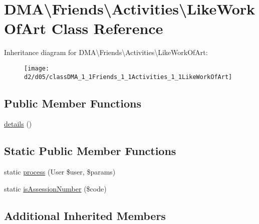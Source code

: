 \hypertarget{classDMA_1_1Friends_1_1Activities_1_1LikeWorkOfArt}{\section{D\+M\+A\textbackslash{}Friends\textbackslash{}Activities\textbackslash{}Like\+Work\+Of\+Art Class Reference}
\label{classDMA_1_1Friends_1_1Activities_1_1LikeWorkOfArt}
}
Inheritance diagram for D\+M\+A\textbackslash{}Friends\textbackslash{}Activities\textbackslash{}Like\+Work\+Of\+Art\+:\begin{figure}[H]
\begin{center}
\leavevmode
\texttt{[image: d2/d05/classDMA\_1\_1Friends\_1\_1Activities\_1\_1LikeWorkOfArt]}
\end{center}
\end{figure}
\subsection*{Public Member Functions}
\begin{DoxyCompactItemize}
\item 
\hyperlink{classDMA_1_1Friends_1_1Activities_1_1LikeWorkOfArt_ad8755c7d0fc4f34acfabc7716acfd52c}{details} ()
\end{DoxyCompactItemize}
\subsection*{Static Public Member Functions}
\begin{DoxyCompactItemize}
\item 
static \hyperlink{classDMA_1_1Friends_1_1Activities_1_1LikeWorkOfArt_a814a0bc1a22cc72f91dac635c871b43c}{process} (User \$user, \$params)
\item 
static \hyperlink{classDMA_1_1Friends_1_1Activities_1_1LikeWorkOfArt_ac18459839d22721c79df721a6f9b7f8b}{is\+Assession\+Number} (\$code)
\end{DoxyCompactItemize}
\subsection*{Additional Inherited Members}


